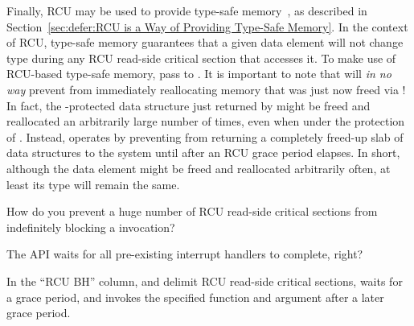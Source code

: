 Finally, RCU may be used to provide
type-safe memory~\cite{Cheriton96a}, as described in
Section~\ref{sec:defer:RCU is a Way of Providing Type-Safe Memory}.
In the context of RCU, type-safe memory guarantees that a given
data element will not change type during any RCU read-side critical section
that accesses it.
To make use of RCU-based type-safe memory, pass
 to .
It is important to note that  will
\emph{in no way}
prevent  from immediately reallocating
memory that was just now freed via !
In fact, the -protected data structure
just returned by  might be freed and reallocated
an arbitrarily large number of times, even when under the protection
of .
Instead,  operates by preventing
from returning a completely freed-up slab of data structures
to the system until after an RCU grace period elapses.
In short, although the data element might be freed and reallocated arbitrarily
often, at least its type will remain the same.

\QuickQuiz{}
	How do you prevent a huge number of RCU read-side critical
	sections from indefinitely blocking a 
	invocation?
 \QuickQuizEnd

\QuickQuiz{}
	The  API waits for all pre-existing
	interrupt handlers to complete, right?
 \QuickQuizEnd

In the ``RCU BH'' column,  and
 delimit RCU read-side critical
sections,  waits for a grace period,
and  invokes the specified
function and argument after a later grace period.

